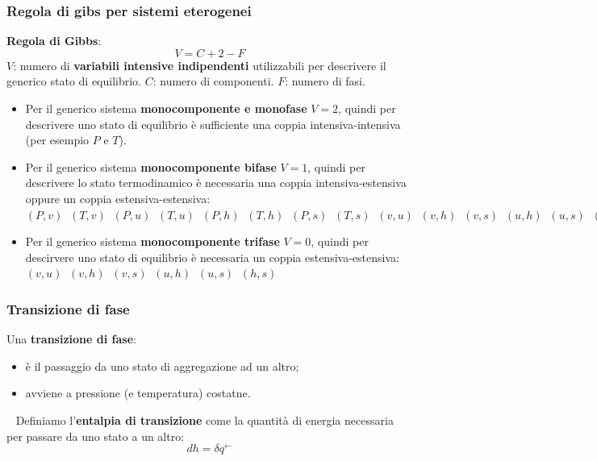 \subsubsection{Regola di gibs per sistemi eterogenei}
\textbf{Regola di Gibbs}:
\[
    V = C + 2 -F
\]
$V$: numero di \textbf{variabili intensive indipendenti} utilizzabili per descrivere il generico stato di equilibrio.\newline
$C$: numero di componenti.\newline
$F$: numero di fasi.
\begin{itemize}
    \item Per il generico sistema \textbf{monocomponente e monofase} $V =2$, quindi per descrivere uno stato di equilibrio è sufficiente una coppia intensiva-intensiva (per esempio $P$ e $T$).
    \item Per il generico sistema \textbf{monocomponente bifase} $V =1$, quindi per descrivere lo stato termodinamico è necessaria una coppia intensiva-estensiva oppure un coppia estensiva-estensiva:\newline
    $(P,v) \;\; (T,v) \;\; (P,u) \;\; (T,u) \;\; (P,h) \;\; (T,h) \;\; (P,s) \;\; (T,s) \;\; (v,u) \;\; (v,h) \;\; (v,s) \;\; (u,h) \;\; (u,s) \;\; (h,s)$
    \item Per il generico sistema \textbf{monocomponente trifase} $V=0$, quindi per descirvere uno stato di equilibrio è necessaria un coppia estensiva-estensiva:\newline
    $(v,u) \;\; (v,h) \;\; (v,s) \;\; (u,h) \;\; (u,s) \;\; (h,s)$
\end{itemize}
\subsubsection{Transizione di fase}
Una \textbf{transizione di fase}:
\begin{itemize}
    \item è il passaggio da uno stato di aggregazione ad un altro;
    \item avviene a pressione (e temperatura) costatne.
\end{itemize}
\ \newline
Definiamo l'\textbf{entalpia di transizione} come la quantità di energia necessaria per passare da uno stato a un altro:
\[
    dh = \delta q^\leftarrow 
\]
